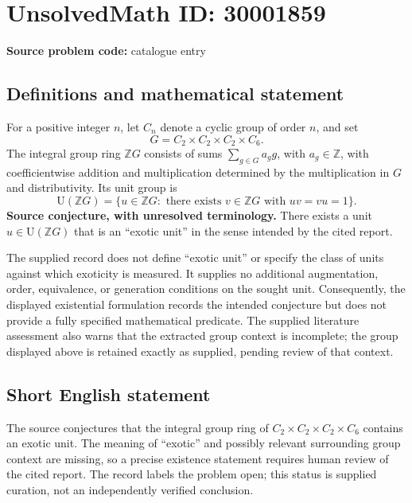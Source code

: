\documentclass[11pt]{article}
\newcommand{\Z}{\mathbb{Z}}
\begin{document}
\section*{UnsolvedMath ID: 30001859}
\textbf{Source problem code:} catalogue entry
\subsection{Definitions and mathematical statement}
For a positive integer \(n\), let \(C_n\) denote a cyclic group of order \(n\), and set
\[
G=C_2\times C_2\times C_2\times C_6.
\]
The integral group ring \(\Z G\) consists of sums \(\sum_{g\in G}a_g g\), with \(a_g\in\Z\), with coefficientwise addition and multiplication determined by the multiplication in \(G\) and distributivity. Its unit group is
\[
\mathrm{U}(\Z G)=\{u\in\Z G:\text{ there exists }v\in\Z G\text{ with }uv=vu=1\}.
\]
\textbf{Source conjecture, with unresolved terminology.} There exists a unit \(u\in\mathrm{U}(\Z G)\) that is an ``exotic unit'' in the sense intended by the cited report.

The supplied record does not define ``exotic unit'' or specify the class of units against which exoticity is measured. It supplies no additional augmentation, order, equivalence, or generation conditions on the sought unit. Consequently, the displayed existential formulation records the intended conjecture but does not provide a fully specified mathematical predicate. The supplied literature assessment also warns that the extracted group context is incomplete; the group displayed above is retained exactly as supplied, pending review of that context.
\subsection{Short English statement}
The source conjectures that the integral group ring of \(C_2\times C_2\times C_2\times C_6\) contains an exotic unit. The meaning of ``exotic'' and possibly relevant surrounding group context are missing, so a precise existence statement requires human review of the cited report. The record labels the problem open; this status is supplied curation, not an independently verified conclusion.
\end{document}
